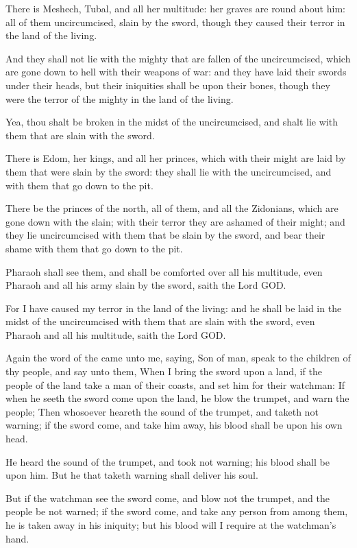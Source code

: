 \Verse There is Meshech, Tubal, and all her multitude: her graves are round about him: all of them uncircumcised, slain by the sword, though they caused their terror in the land of the living.

\Verse And they shall not lie with the mighty that are fallen of the uncircumcised, which are gone down to hell with their weapons of war: and they have laid their swords under their heads, but their iniquities shall be upon their bones, though they were the terror of the mighty in the land of the living.

\Verse Yea, thou shalt be broken in the midst of the uncircumcised, and shalt lie with them that are slain with the sword.

\Verse There is Edom, her kings, and all her princes, which with their might are laid by them that were slain by the sword: they shall lie with the uncircumcised, and with them that go down to the pit.

\Verse There be the princes of the north, all of them, and all the Zidonians, which are gone down with the slain; with their terror they are ashamed of their might; and they lie uncircumcised with them that be slain by the sword, and bear their shame with them that go down to the pit.

\Verse Pharaoh shall see them, and shall be comforted over all his multitude, even Pharaoh and all his army slain by the sword, saith the Lord GOD.

\Verse For I have caused my terror in the land of the living: and he shall be laid in the midst of the uncircumcised with them that are slain with the sword, even Pharaoh and all his multitude, saith the Lord GOD.


\Chapter
\Verse Again the word of the \LORD came unto me, saying, \Verse Son of man, speak to the children of thy people, and say unto them, When I bring the sword upon a land, if the people of the land take a man of their coasts, and set him for their watchman: \Verse If when he seeth the sword come upon the land, he blow the trumpet, and warn the people; \Verse Then whosoever heareth the sound of the trumpet, and taketh not warning; if the sword come, and take him away, his blood shall be upon his own head.

\Verse He heard the sound of the trumpet, and took not warning; his blood shall be upon him. But he that taketh warning shall deliver his soul.

\Verse But if the watchman see the sword come, and blow not the trumpet, and the people be not warned; if the sword come, and take any person from among them, he is taken away in his iniquity; but his blood will I require at the watchman's hand.

